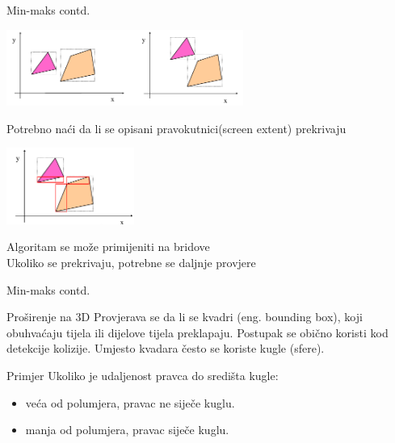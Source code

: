 \documentclass[9pt]{beamer}
\begin{document}
\begin{frame}{Min-maks contd.}
	\begin{center}
		\includegraphics[height=2.5cm]{slike/04_minmax_2.png}
	\end{center}
	Potrebno naći da li se opisani pravokutnici(screen extent) prekrivaju 
	\begin{center}
		\includegraphics[height=2.5cm]{slike/04_minmax_3.png}
	\end{center}
	Algoritam se može primijeniti na bridove\\
	Ukoliko se prekrivaju, potrebne se daljnje provjere
\end{frame}

\begin{frame}{Min-maks contd.}
	\begin{block}{Proširenje na 3D}
		Provjerava se da li se kvadri (eng. bounding box), koji obuhvaćaju tijela
		ili dijelove tijela preklapaju. Postupak se obično koristi kod detekcije
		kolizije. Umjesto kvadara često se koriste kugle (sfere). 
	\end{block}
	\begin{block}{Primjer}
		Ukoliko je udaljenost pravca do središta kugle:\\
		\begin{itemize}
			\item veća od polumjera, pravac ne siječe kuglu.
			\item manja od polumjera, pravac siječe kuglu.
		\end{itemize}
	\end{block}
\end{frame}

\end{document}
